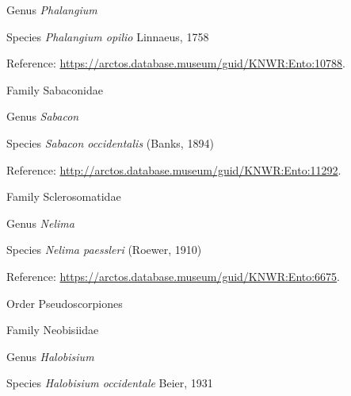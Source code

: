 \documentclass[9pt, article]{memoir}
\begin{document}
\begin{multicols}{2}
\vspace{6pt}\noindent\hspace{30pt}Genus \textit{Phalangium}


\vspace{6pt}\noindent\hspace{36pt}Species \textit{Phalangium opilio} Linnaeus, 1758


\vspace{6pt}Reference: 
\url{https://arctos.database.museum/guid/KNWR:Ento:10788}.

\vspace{6pt}\noindent\hspace{24pt}Family Sabaconidae


\vspace{6pt}\noindent\hspace{30pt}Genus \textit{Sabacon}


\vspace{6pt}\noindent\hspace{36pt}Species \textit{Sabacon occidentalis} (Banks, 1894)


\vspace{6pt}Reference: 
\url{http://arctos.database.museum/guid/KNWR:Ento:11292}.

\vspace{6pt}\noindent\hspace{24pt}Family Sclerosomatidae


\vspace{6pt}\noindent\hspace{30pt}Genus \textit{Nelima}


\vspace{6pt}\noindent\hspace{36pt}Species \textit{Nelima paessleri} (Roewer, 1910)


\vspace{6pt}Reference: 
\url{https://arctos.database.museum/guid/KNWR:Ento:6675}.

\vspace{6pt}\noindent\hspace{18pt}Order Pseudoscorpiones


\vspace{6pt}\noindent\hspace{24pt}Family Neobisiidae


\vspace{6pt}\noindent\hspace{30pt}Genus \textit{Halobisium}


\vspace{6pt}\noindent\hspace{36pt}Species \textit{Halobisium occidentale} Beier, 1931



\end{multicols}
\end{document}
